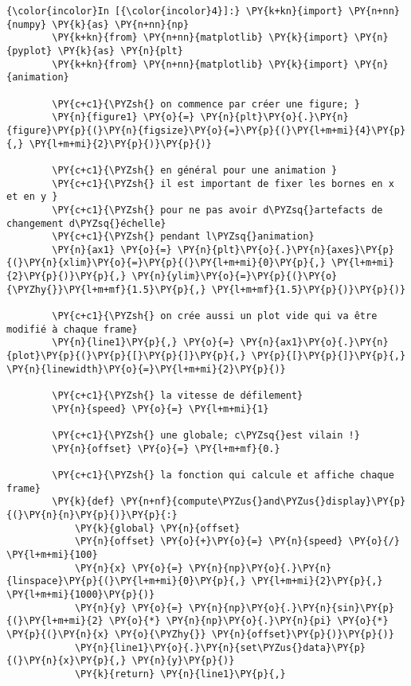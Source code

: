     \begin{Verbatim}[commandchars=\\\{\},frame=single,framerule=0.3mm,rulecolor=\color{cellframecolor}]
{\color{incolor}In [{\color{incolor}4}]:} \PY{k+kn}{import} \PY{n+nn}{numpy} \PY{k}{as} \PY{n+nn}{np}
        \PY{k+kn}{from} \PY{n+nn}{matplotlib} \PY{k}{import} \PY{n}{pyplot} \PY{k}{as} \PY{n}{plt}
        \PY{k+kn}{from} \PY{n+nn}{matplotlib} \PY{k}{import} \PY{n}{animation}
        
        \PY{c+c1}{\PYZsh{} on commence par créer une figure; }
        \PY{n}{figure1} \PY{o}{=} \PY{n}{plt}\PY{o}{.}\PY{n}{figure}\PY{p}{(}\PY{n}{figsize}\PY{o}{=}\PY{p}{(}\PY{l+m+mi}{4}\PY{p}{,} \PY{l+m+mi}{2}\PY{p}{)}\PY{p}{)}
        
        \PY{c+c1}{\PYZsh{} en général pour une animation }
        \PY{c+c1}{\PYZsh{} il est important de fixer les bornes en x et en y }
        \PY{c+c1}{\PYZsh{} pour ne pas avoir d\PYZsq{}artefacts de changement d\PYZsq{}échelle}
        \PY{c+c1}{\PYZsh{} pendant l\PYZsq{}animation}
        \PY{n}{ax1} \PY{o}{=} \PY{n}{plt}\PY{o}{.}\PY{n}{axes}\PY{p}{(}\PY{n}{xlim}\PY{o}{=}\PY{p}{(}\PY{l+m+mi}{0}\PY{p}{,} \PY{l+m+mi}{2}\PY{p}{)}\PY{p}{,} \PY{n}{ylim}\PY{o}{=}\PY{p}{(}\PY{o}{\PYZhy{}}\PY{l+m+mf}{1.5}\PY{p}{,} \PY{l+m+mf}{1.5}\PY{p}{)}\PY{p}{)}
        
        \PY{c+c1}{\PYZsh{} on crée aussi un plot vide qui va être modifié à chaque frame}
        \PY{n}{line1}\PY{p}{,} \PY{o}{=} \PY{n}{ax1}\PY{o}{.}\PY{n}{plot}\PY{p}{(}\PY{p}{[}\PY{p}{]}\PY{p}{,} \PY{p}{[}\PY{p}{]}\PY{p}{,} \PY{n}{linewidth}\PY{o}{=}\PY{l+m+mi}{2}\PY{p}{)}
        
        \PY{c+c1}{\PYZsh{} la vitesse de défilement}
        \PY{n}{speed} \PY{o}{=} \PY{l+m+mi}{1}
        
        \PY{c+c1}{\PYZsh{} une globale; c\PYZsq{}est vilain !}
        \PY{n}{offset} \PY{o}{=} \PY{l+m+mf}{0.}
        
        \PY{c+c1}{\PYZsh{} la fonction qui calcule et affiche chaque frame}
        \PY{k}{def} \PY{n+nf}{compute\PYZus{}and\PYZus{}display}\PY{p}{(}\PY{n}{n}\PY{p}{)}\PY{p}{:}
            \PY{k}{global} \PY{n}{offset}
            \PY{n}{offset} \PY{o}{+}\PY{o}{=} \PY{n}{speed} \PY{o}{/} \PY{l+m+mi}{100}
            \PY{n}{x} \PY{o}{=} \PY{n}{np}\PY{o}{.}\PY{n}{linspace}\PY{p}{(}\PY{l+m+mi}{0}\PY{p}{,} \PY{l+m+mi}{2}\PY{p}{,} \PY{l+m+mi}{1000}\PY{p}{)}
            \PY{n}{y} \PY{o}{=} \PY{n}{np}\PY{o}{.}\PY{n}{sin}\PY{p}{(}\PY{l+m+mi}{2} \PY{o}{*} \PY{n}{np}\PY{o}{.}\PY{n}{pi} \PY{o}{*} \PY{p}{(}\PY{n}{x} \PY{o}{\PYZhy{}} \PY{n}{offset}\PY{p}{)}\PY{p}{)}
            \PY{n}{line1}\PY{o}{.}\PY{n}{set\PYZus{}data}\PY{p}{(}\PY{n}{x}\PY{p}{,} \PY{n}{y}\PY{p}{)}
            \PY{k}{return} \PY{n}{line1}\PY{p}{,}
        

\end{Verbatim}
